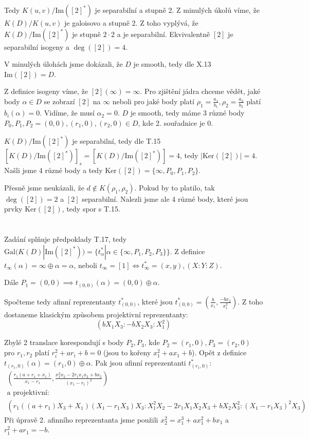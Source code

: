\documentclass[12pt, a4paper]{article}
\begin{document}
Tedy $K(u,v)/\text{Im}([2]^*)$ je separabilní a stupně 2. Z minulých úkolů víme, že $K(D)/K(u,v)$ je galoisovo a stupně 2. Z toho vyplývá, že $K(D)/\text{Im}([2]^*)$ je stupně $2\cdot2$ a je separabilní. Ekvivalentně $[2]$ je separabilní isogeny a $\deg([2])=4$.

V minulých úlohách jsme dokázali, že $D$ je smooth, tedy dle X.13 $\text{Im}([2])=D$.

Z definice isogeny víme, že $[2](\infty) = \infty$. Pro zjištění jádra chceme vědět, jaké body $\alpha \in D$ se zobrazí $[2]$ na $\infty$ neboli pro jaké body platí $\rho_1 = \frac{a_1}{b_1}, \rho_2 = \frac{a_2}{b_2}$ platí $b_i(\alpha)=0$. Vidíme, že musí $\alpha_2 = 0$. $D$ je smooth, tedy máme $3$ různé body $P_0,P_1,P_2 = (0,0),(r_1,0),(r_2,0) \in D$, kde 2. souřadnice je 0.

$K(D)/\text{Im}([2]^*)$ je separabilní, tedy dle T.15 $[K(D)/\text{Im}([2]^*)]_s = [K(D)/\text{Im}([2]^*)] = 4$, tedy $|\text{Ker}([2])|=4$. Našli jsme 4 různé body a tedy $\text{Ker}([2]) = \{\infty, P_0, P_1, P_2\}$. 

Přesně jsme neukázali, že $d \notin K(\rho_1, \rho_2)$. Pokud by to platilo, tak $\deg([2]) = 2$ a $[2]$ separabilní. Nalezli jsme ale 4 různé body, které jsou prvky $\text{Ker}([2])$, tedy spor s T.15.

\section{}
Zadání splňuje předpoklady T.17, tedy $\text{Gal}(K(D)|\text{Im}([2]^*)) = \{t^*_\alpha| \alpha \in \{\infty, P_1, P_2, P_3\}\}$.
Z definice $t_\infty (\alpha) = \infty \oplus \alpha = \alpha$, neboli $t_\infty = [1] \iff t_\infty^* = (x,y), (X:Y:Z)$.

Dále $P_1 = (0,0) \implies t_{(0,0)}(\alpha) = (0,0) \oplus \alpha$.

Spočteme tedy afinní reprezentanty $t_{(0,0)}^*$, které jsou $t_{(0,0)}^* = \left( \frac{b}{x_1}, \frac{-bx_2}{x_1^2} \right)$. Z toho dostaneme klasickým způsobem projektivní reprezentanty: 
\[(bX_1X_3 : -bX_2X_3 : X_1^2) \]

Zbylé 2 translace korespondují s body $P_2,P_3$, kde $P_2 = (r_1, 0), P_3 = (r_2, 0)$ pro $r_1,r_2$ platí $r_i^2+ar_i+b = 0$ (jsou to kořeny $x_1^2+ax_1+b$). Opět z definice $t_{(r_1,0)}(\alpha) = (r_1,0) \oplus \alpha$. Pak jsou afinní reprezentanti $t_{(r_1,0)}^*$: 
\begin{gather*}
\left(\frac{r_1(a+r_1+x_1)}{x_1-r_1}, \frac{x_1^2x_2-2r_1x_1x_2 + bx_2}{(x_1-r_1)^2} \right )\\
\text{a projektivní:}\\
\left(r_1((a+r_1)X_3 + X_1)(X_1-r_1X_3)X_3 : X_1^2X_2-2r_1X_1X_2X_3+bX_2X_3^2 : (X_1-r_1X_3)^2X_3 \right)
\end{gather*}
Při úpravě 2. afinního reprezentanta jsme použili $x_2^2 = x_1^3+ax_1^2+bx_1$ a $r_1^2+ar_1 = -b$.
\end{document}
